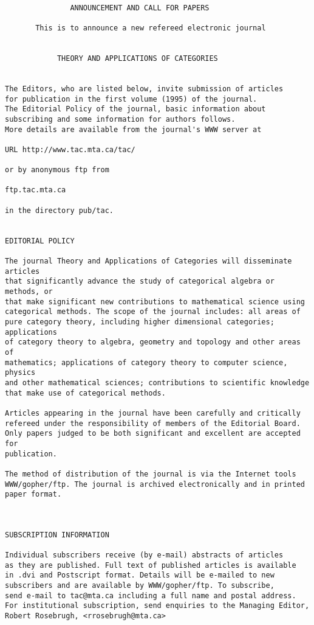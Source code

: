 \begin{verbatim}

               ANNOUNCEMENT AND CALL FOR PAPERS
 
       This is to announce a new refereed electronic journal
 
 
            THEORY AND APPLICATIONS OF CATEGORIES
 
 
The Editors, who are listed below, invite submission of articles 
for publication in the first volume (1995) of the journal.   
The Editorial Policy of the journal, basic information about 
subscribing and some information for authors follows. 
More details are available from the journal's WWW server at
 
URL http://www.tac.mta.ca/tac/
 
or by anonymous ftp from
 
ftp.tac.mta.ca
 
in the directory pub/tac.
 
 
EDITORIAL POLICY
 
The journal Theory and Applications of Categories will disseminate articles 
that significantly advance the study of categorical algebra or methods, or 
that make significant new contributions to mathematical science using 
categorical methods. The scope of the journal includes: all areas of 
pure category theory, including higher dimensional categories; applications 
of category theory to algebra, geometry and topology and other areas of 
mathematics; applications of category theory to computer science, physics 
and other mathematical sciences; contributions to scientific knowledge 
that make use of categorical methods.
 
Articles appearing in the journal have been carefully and critically 
refereed under the responsibility of members of the Editorial Board.
Only papers judged to be both significant and excellent are accepted for 
publication. 
 
The method of distribution of the journal is via the Internet tools 
WWW/gopher/ftp. The journal is archived electronically and in printed 
paper format. 
 
 
 
SUBSCRIPTION INFORMATION
 
Individual subscribers receive (by e-mail) abstracts of articles 
as they are published. Full text of published articles is available 
in .dvi and Postscript format. Details will be e-mailed to new 
subscribers and are available by WWW/gopher/ftp. To subscribe, 
send e-mail to tac@mta.ca including a full name and postal address. 
For institutional subscription, send enquiries to the Managing Editor, 
Robert Rosebrugh, <rrosebrugh@mta.ca>
 

\end{verbatim}
